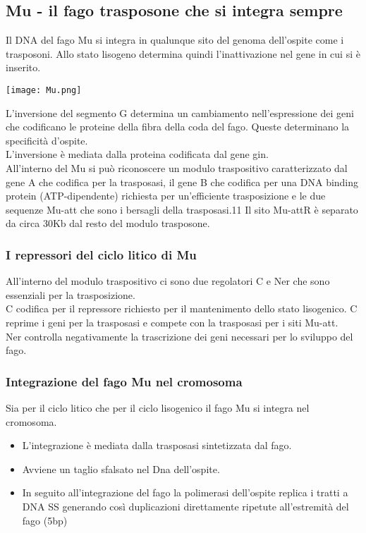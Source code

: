 \documentclass{article}
\begin{document}
\subsection{Mu - il fago trasposone che si integra sempre}
Il DNA del fago Mu si integra in qualunque sito del genoma dell'ospite come i trasposoni. Allo stato lisogeno determina quindi l'inattivazione nel gene in cui si è inserito.
\begin{center}
    \texttt{[image: Mu.png]}
\end{center}
L'inversione del segmento G determina un cambiamento
nell'espressione dei geni che codificano le proteine della fibra della
coda del fago. Queste determinano la specificità d'ospite.\\
L'inversione è mediata dalla proteina codificata dal gene gin.\\
All'interno del Mu si può riconoscere un modulo traspositivo caratterizzato dal gene A che codifica per la trasposasi, il gene B che codifica per una DNA binding protein (ATP-dipendente)
richiesta per un'efficiente trasposizione e le due sequenze Mu-att che sono i bersagli della trasposasi.11
Il sito Mu-attR è separato da circa 30Kb dal resto del modulo trasposone.
\subsubsection{I repressori del ciclo litico di Mu}
All'interno del modulo traspositivo ci sono due regolatori C e Ner che sono essenziali per la trasposizione.\\
C codifica per il repressore richiesto per il mantenimento dello stato lisogenico.
C reprime i geni per la trasposasi e compete con la trasposasi per i siti Mu-att.\\
Ner controlla negativamente la trascrizione dei geni necessari per lo sviluppo del fago.
\subsubsection{Integrazione del fago Mu nel cromosoma}
Sia per il ciclo litico che per il ciclo lisogenico il fago Mu si integra nel cromosoma.\\
\begin{itemize}
    \item L'integrazione è mediata dalla trasposasi sintetizzata dal fago.
    \item Avviene un taglio sfalsato nel Dna dell'ospite.
    \item In seguito all'integrazione del fago la polimerasi dell'ospite replica i tratti a DNA SS generando così duplicazioni direttamente ripetute all'estremità del fago (5bp)\\
\end{itemize}
\end{document}
